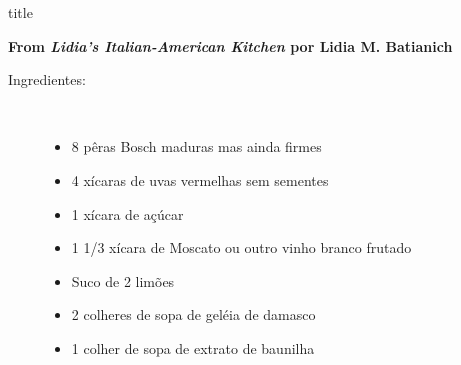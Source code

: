 \documentclass [11pt, letterpaper] {article}
\begin{document}
 {title}

\begin {flushright}
{\bf From {\it Lidia's Italian-American Kitchen} por Lidia M. Batianich}
\end {flushright}

\begin {description}

\item [Ingredientes:] \ \\
\begin {itemize}
\item 8 p\^eras Bosch maduras mas ainda firmes
\item 4 xícaras de uvas vermelhas sem sementes
\item 1 xícara de açúcar
\item 1 1/3 xícara de Moscato ou outro vinho branco frutado
\item Suco de 2 limões
\item 2 colheres de sopa de geléia de damasco
\item 1 colher de sopa de extrato de baunilha
\end {itemize}


\end{description}
\end{document}
